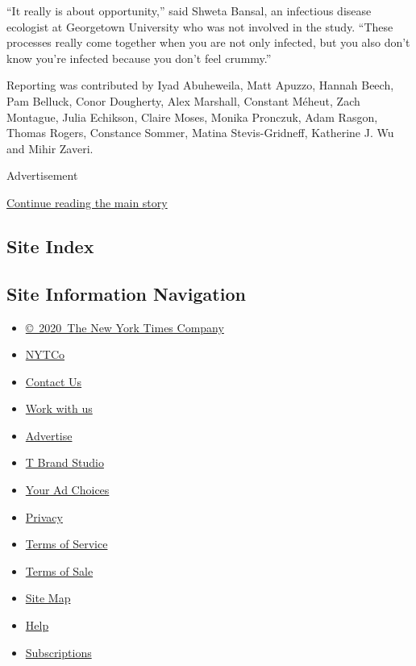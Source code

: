 ``It really is about opportunity,'' said Shweta Bansal, an infectious
disease ecologist at Georgetown University who was not involved in the
study. ``These processes really come together when you are not only
infected, but you also don't know you're infected because you don't feel
crummy.''

Reporting was contributed by Iyad Abuheweila, Matt Apuzzo, Hannah Beech,
Pam Belluck, Conor Dougherty, Alex Marshall, Constant Méheut, Zach
Montague, Julia Echikson, Claire Moses, Monika Pronczuk, Adam Rasgon,
Thomas Rogers, Constance Sommer, Matina Stevis-Gridneff, Katherine J. Wu
and Mihir Zaveri.

Advertisement

\protect\hyperlink{after-bottom}{Continue reading the main story}

\hypertarget{site-index}{%
\subsection{Site Index}\label{site-index}}

\hypertarget{site-information-navigation}{%
\subsection{Site Information
Navigation}\label{site-information-navigation}}

\begin{itemize}
\tightlist
\item
  \href{https://help.nytimes.com/hc/en-us/articles/115014792127-Copyright-notice}{©~2020~The
  New York Times Company}
\end{itemize}

\begin{itemize}
\tightlist
\item
  \href{https://www.nytco.com/}{NYTCo}
\item
  \href{https://help.nytimes.com/hc/en-us/articles/115015385887-Contact-Us}{Contact
  Us}
\item
  \href{https://www.nytco.com/careers/}{Work with us}
\item
  \href{https://nytmediakit.com/}{Advertise}
\item
  \href{http://www.tbrandstudio.com/}{T Brand Studio}
\item
  \href{https://www.nytimes.com/privacy/cookie-policy\#how-do-i-manage-trackers}{Your
  Ad Choices}
\item
  \href{https://www.nytimes.com/privacy}{Privacy}
\item
  \href{https://help.nytimes.com/hc/en-us/articles/115014893428-Terms-of-service}{Terms
  of Service}
\item
  \href{https://help.nytimes.com/hc/en-us/articles/115014893968-Terms-of-sale}{Terms
  of Sale}
\item
  \href{https://spiderbites.nytimes.com}{Site Map}
\item
  \href{https://help.nytimes.com/hc/en-us}{Help}
\item
  \href{https://www.nytimes.com/subscription?campaignId=37WXW}{Subscriptions}
\end{itemize}
